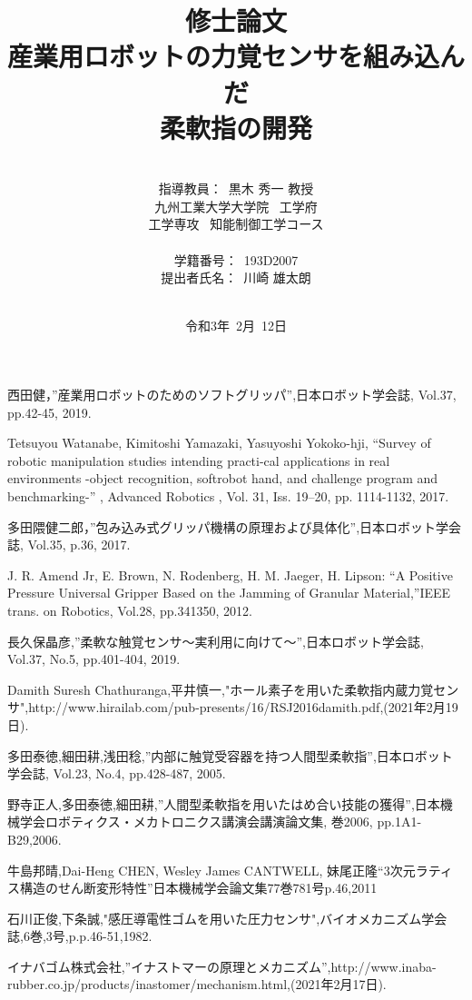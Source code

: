 \documentclass[a4paper,12pt]{jarticle}
\title{修士論文\\
産業用ロボットの力覚センサを組み込んだ\\柔軟指の開発\\
}
\author{\vspace{90mm}\\
指導教員：\ 黒木 \hspace{0mm} 秀一 教授\\
九州工業大学大学院\ \hspace{0mm} 工学府\\
工学専攻\ \hspace{0mm} 知能制御工学コース \\
\vspace{0mm}\\
学籍番号：\ 193D2007\\
提出者氏名：\ 川崎 \hspace{0mm} 雄太朗\\\vspace{5mm}\\ }
\date{令和3年\ 2月\ 12日}
\begin{document}
\titlepage
\maketitle
\thispagestyle{empty}
\newpage
\addtocounter{page}{-1}

\thispagestyle{empty}

\newpage
\thispagestyle{empty}
\addtocounter{page}{-2}
\tableofcontents


\newpage

\newpage

\newpage

\newpage





\begin{thebibliography}{99}

 西田健，”産業用ロボットのためのソフトグリッパ”,日本ロボット学会誌, Vol.37, pp.42-45, 2019.


 Tetsuyou Watanabe, Kimitoshi Yamazaki, Yasuyoshi Yokoko-hji, “Survey of robotic manipulation studies intending practi-cal applications in real environments -object recognition, softrobot hand, and challenge program and benchmarking-” , Advanced Robotics , Vol. 31, Iss. 19–20, pp. 1114-1132, 2017.

 多田隈健二郎，”包み込み式グリッパ機構の原理および具体化”,日本ロボット学会誌, Vol.35, p.36, 2017.

J. R. Amend Jr, E. Brown, N. Rodenberg, H. M. Jaeger, H. Lipson: “A Positive Pressure Universal Gripper Based on the Jamming of Granular Material,”IEEE trans. on Robotics, Vol.28, pp.341350, 2012.

 長久保晶彦,”柔軟な触覚センサ〜実利用に向けて〜”,日本ロボット学会誌, Vol.37, No.5, pp.401-404, 2019.

Damith Suresh Chathuranga,平井慎一,"ホール素子を用いた柔軟指内蔵力覚センサ",http://www.hirailab.com/pub-presents/16/RSJ2016damith.pdf,(2021年2月19日).

 多田泰徳,細田耕,浅田稔,”内部に触覚受容器を持つ人間型柔軟指”,日本ロボット学会誌, Vol.23, No.4, pp.428-487, 2005.

 野寺正人,多田泰徳,細田耕,”人間型柔軟指を用いたはめ合い技能の獲得”,日本機械学会ロボティクス・メカトロニクス講演会講演論文集, 巻2006, pp.1A1-B29,2006.

牛島邦晴,Dai-Heng CHEN, Wesley James CANTWELL, 妹尾正隆“3次元ラティス構造のせん断変形特性”日本機械学会論文集77巻781号p.46,2011

 石川正俊,下条誠,"感圧導電性ゴムを用いた圧力センサ",バイオメカニズム学会誌,6巻,3号,p.p.46-51,1982.

 イナバゴム株式会社,”イナストマーの原理とメカニズム”,http://www.inaba-rubber.co.jp/products/inastomer/mechanism.html,(2021年2月17日).



\end{thebibliography}
\end{document}
